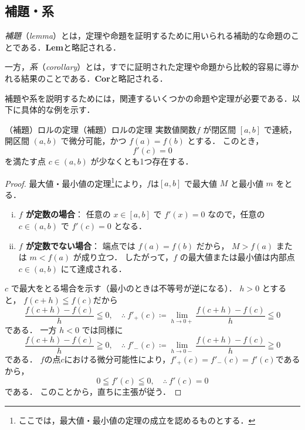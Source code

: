 \subsection{補題・系}

\emph{補題}（\emph{lemma}）とは，定理や命題を証明するために用いられる補助的な命題のことである．\textbf{Lem}と略記される．

一方，\emph{系}（\emph{corollary}）とは，すでに証明された定理や命題から比較的容易に導かれる結果のことである．\textbf{Cor}と略記される．

補題や系を説明するためには，関連するいくつかの命題や定理が必要である．以下に具体的な例を示す．


\begin{example}{（補題）ロルの定理}{（補題）ロルの定理}
  実数値関数$f$ が閉区間 $[a,b]$ で連続，開区間 $(a,b)$ で微分可能，かつ $f(a)=f(b)$ とする．
  このとき，
  \[
  f'(c)=0
  \]
  を満たす点 $c \in (a,b)$ が少なくとも1つ存在する．
\end{example}

\begin{tleftbar}
\begin{proof}
最大値・最小値の定理\footnote{ここでは，最大値・最小値の定理の成立を認めるものとする．}により，$f$は$[a,b]$ で最大値 $M$ と最小値 $m$ をとる．

\begin{enumerate}[(i)]
  \item \textbf{$f$ が定数の場合}：
  任意の $x \in [a,b]$ で $f'(x)=0$ なので，任意の $c \in(a,b)$ で
  $f'(c)=0$ となる．

  \item \textbf{$f$ が定数でない場合}：
  端点では $f(a)=f(b)$ だから，
  $M>f(a)$ または $m<f(a)$ が成り立つ．
  したがって，$f$ の最大値または最小値は内部点
  $c \in(a,b)$ にて達成される．
\end{enumerate}

$c$ で最大をとる場合を示す（最小のときは不等号が逆になる）．
$h>0$ とすると， $f(c+h) \leqq f(c)$だから
\[
\frac{f(c+h)-f(c)}{h} \leqq 0 ,\quad \therefore ~ f'_+(c) \coloneqq \lim_{h \to 0+} \frac{f(c+h)-f(c)}{h}\leqq 0
\]
である．
一方 $h<0$ では同様に
\[
\frac{f(c+h)-f(c)}{h}\geqq 0 , \quad \therefore~  f'_-(c)\coloneqq \lim_{h\to0-}\frac{f(c+h)-f(c)}{h}\geqq 0
\]
である．
$f$の点$c$における微分可能性により，$f'_+(c)=f'_-(c)=f'(c)$であるから，
\[
0\leqq f'(c)\leqq 0 , \quad \therefore ~f'(c)=0
\]
である．
このことから，直ちに主張が従う．
\end{proof}
\end{tleftbar}


